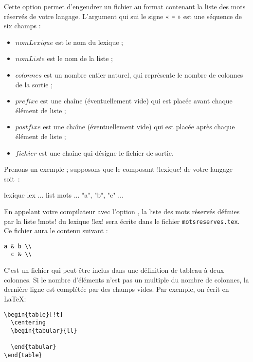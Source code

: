  Cette option permet d'engendrer un fichier au format contenant la liste des mots réservés de votre langage. L'argument qui sui le signe « \texttt{=} » est une séquence de six champs :
\begin{itemize}
  \item $nomLexique$ est le nom du lexique ;
  \item $nomListe$ est le nom de la liste ;
  \item $colonnes$ est un nombre entier naturel, qui représente le nombre de colonnes de la sortie ;
  \item $prefixe$ est une chaîne (éventuellement vide) qui est placée avant chaque élément de liste ;
  \item $postfixe$ est une chaîne (éventuellement vide) qui est placée après chaque élément de liste ;
  \item $fichier$ est une chaîne qui désigne le fichier de sortie.
\end{itemize}

Prenons un exemple ; supposons que le composant \ggs!lexique! de votre langage soit~:
\begin{galgas}
lexique lex {
  ...
  list mots ... { "a", "b", "c" }
  ...
}
\end{galgas}

En appelant votre compilateur avec l'option , la liste des mots réservés définies par la liste \ggs!mots! du lexique \ggs!lex! sera écrite dans le fichier \texttt{motsreserves.tex}. Ce fichier aura le contenu suivant :
\begin{lstlisting}[backgroundcolor=\color{yellow!10}, frame=tlbr, basicstyle=\small\tt]
  a & b \\
  c & \\
\end{lstlisting}

C'est un fichier qui peut être inclus dans une définition de tableau à deux colonnes. Si le nombre d'éléments n'est pas un multiple du nombre de colonnes, la dernière ligne est complétée par des champs vides. Par exemple, on écrit en \LaTeX :
\begin{lstlisting}[backgroundcolor=\color{yellow!10}, frame=tlbr, basicstyle=\small\tt]
\begin{table}[!t]
  \centering
  \begin{tabular}{ll}
    
  \end{tabular}
\end{table}
\end{lstlisting}

